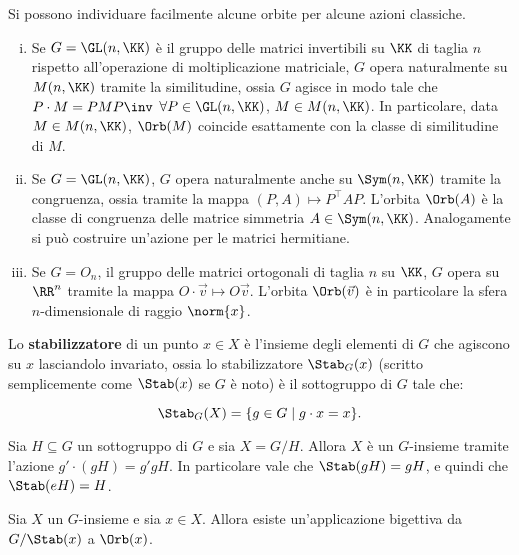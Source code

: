 \documentclass[11pt]{article}
\begin{document}
	\begin{example} Si possono individuare facilmente alcune orbite per alcune azioni classiche.
		\begin{enumerate}[(i)]
			\item Se $G = \GL(n, \KK)$ è il gruppo delle matrici invertibili su $\KK$ di taglia $n$ rispetto
			all'operazione di moltiplicazione matriciale, $G$ opera naturalmente su $M(n, \KK)$ tramite
			la similitudine, ossia $G$ agisce in modo tale che $P \cdot M = P M P\inv$ $\forall P \in \GL(n, \KK)$,
			$M \in M(n, \KK)$. In particolare, data $M \in M(n, \KK)$, $\Orb(M)$ coincide esattamente
			con la classe di similitudine di $M$.
			
			\item Se $G = \GL(n, \KK)$, $G$ opera naturalmente anche su $\Sym(n, \KK)$
			tramite la congruenza, ossia tramite la mappa $(P, A) \mapsto P^\top A P$. L'orbita $\Orb(A)$ è la classe di congruenza delle matrice simmetria $A \in \Sym(n, \KK)$. Analogamente si può costruire un'azione per le
			matrici hermitiane.
			
			\item Se $G = O_n$, il gruppo delle matrici ortogonali di taglia $n$ su $\KK$, $G$ opera su $\RR^n$ tramite la mappa $O \cdot \vec v \mapsto O \vec v$. L'orbita $\Orb(\vec v)$ è in particolare la sfera $n$-dimensionale di raggio $\norm{x}$.
		\end{enumerate}
	\end{example}

	\begin{definition} [stabilizzatore di $x$]
		Lo \textbf{stabilizzatore} di un punto $x \in X$ è l'insieme degli elementi di $G$ che
		agiscono su $x$ lasciandolo invariato, ossia lo stabilizzatore $\Stab_G(x)$ (scritto semplicemente come $\Stab(x)$ se $G$ è noto) è il sottogruppo
		di $G$ tale che:
		
		\[ \Stab_G(X) = \{g \in G \mid g \cdot x = x \}. \]
	\end{definition}

	\begin{example}
		Sia $H \subseteq G$ un sottogruppo di $G$ e sia $X = G/H$. Allora $X$ è un $G$-insieme tramite l'azione $g' \cdot (gH) = g'gH$. In particolare
		vale che $\Stab(gH) = gH$, e quindi che $\Stab(eH) = H$.
	\end{example}

	\begin{theorem} 
		Sia $X$ un $G$-insieme e sia $x \in X$. Allora esiste un'applicazione
		bigettiva da $G/\Stab(x)$ a $\Orb(x)$.
	\end{theorem}
\end{document}
